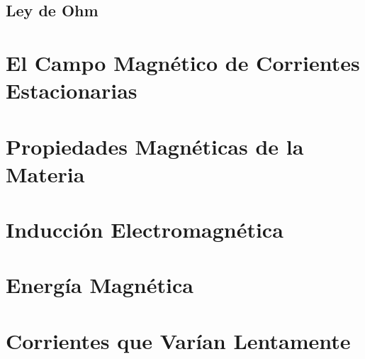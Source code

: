 \section{Ley de Ohm}









\chapter{El Campo Magnético de Corrientes Estacionarias}









\chapter{Propiedades Magnéticas de la Materia}













\chapter{Inducción Electromagnética}














\chapter{Energía Magnética}













\chapter{Corrientes que Varían Lentamente}















